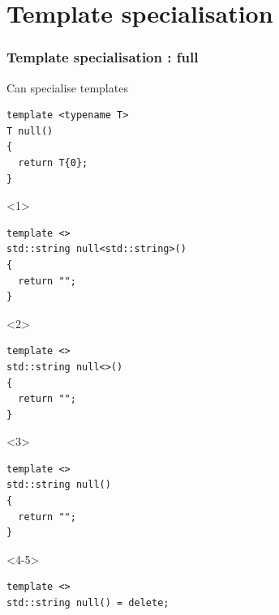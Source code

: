 \documentclass[14pt]{beamer}
\begin{document}
\section{Template specialisation}
\frame{\sectionpage}

\begin{frame}[fragile]
  \frametitle{Template specialisation : full}

  Can specialise templates

  \begin{overlayarea}{\textwidth}{6.5cm}
  \begin{lstlisting}[basicstyle=\codefontsize{12pt}]
template <typename T>
T null()
{
  return T{0};
}
  \end{lstlisting}

  \begin{onlyenv}<1>
  \begin{lstlisting}[basicstyle=\codefontsize{12pt}]
template <>
std::string null<std::string>()
{
  return "";
}
  \end{lstlisting}
  \end{onlyenv}

  \begin{onlyenv}<2>
  \begin{lstlisting}[basicstyle=\codefontsize{12pt}]
template <>
std::string null<>()
{
  return "";
}
  \end{lstlisting}
  \end{onlyenv}

  \begin{onlyenv}<3>
  \begin{lstlisting}[basicstyle=\codefontsize{12pt}]
template <>
std::string null()
{
  return "";
}
  \end{lstlisting}
  \end{onlyenv}

  \begin{onlyenv}<4-5>
  \begin{lstlisting}[basicstyle=\codefontsize{12pt}]
template <>
std::string null() = delete;
  \end{lstlisting}

  \end{onlyenv}

  \end{overlayarea}

\end{frame}
\end{document}
